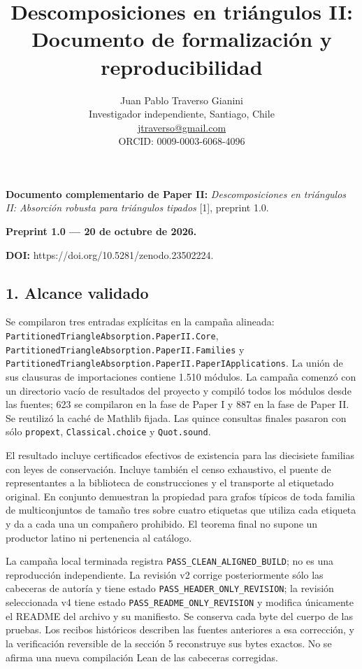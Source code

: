 \documentclass[spanish,11pt,a4paper]{article}
\title{Descomposiciones en triángulos II: Documento de formalización y reproducibilidad}
\author{Juan Pablo Traverso Gianini\\
\small Investigador independiente, Santiago, Chile\\
\small \href{mailto:jtraverso@gmail.com}{jtraverso@gmail.com}\\
\small ORCID: 0009-0003-6068-4096}
\date{}
\begin{document}
\raggedbottom
\maketitle
\textbf{Documento complementario de Paper II:} \emph{Descomposiciones en triángulos II: Absorción robusta para triángulos tipados} {[}1{]}, preprint 1.0.

\textbf{Preprint 1.0 --- 20 de octubre de 2026.}

\textbf{DOI:} https://doi.org/10.5281/zenodo.23502224.

\subsection{1. Alcance validado}\label{alcance-validado}

Se compilaron tres entradas explícitas en la campaña alineada: \texttt{Partitioned\allowbreak{}T\allowbreak{}riangle\allowbreak{}Absor\allowbreak{}ption.\allowbreak{}Paper\allowbreak{}I\allowbreak{}I.\allowbreak{}Core}, \texttt{Partitioned\allowbreak{}T\allowbreak{}riangle\allowbreak{}Absor\allowbreak{}ption.\allowbreak{}Paper\allowbreak{}I\allowbreak{}I.\allowbreak{}Families} y \texttt{Partitioned\allowbreak{}T\allowbreak{}riangle\allowbreak{}Absor\allowbreak{}ption.\allowbreak{}Paper\allowbreak{}I\allowbreak{}I.\allowbreak{}Paper\allowbreak{}IAppl\allowbreak{}ications}. La unión de sus clausuras de importaciones contiene 1.510 módulos. La campaña comenzó con un directorio vacío de resultados del proyecto y compiló todos los módulos desde las fuentes; 623 se compilaron en la fase de Paper I y 887 en la fase de Paper II. Se reutilizó la caché de Mathlib fijada. Las quince consultas finales pasaron con sólo \texttt{propext}, \texttt{Classical.\allowbreak{}ch\allowbreak{}oice} y \texttt{Quot.\allowbreak{}sound}.

El resultado incluye certificados efectivos de existencia para las diecisiete familias con leyes de conservación. Incluye también el censo exhaustivo, el puente de representantes a la biblioteca de construcciones y el transporte al etiquetado original. En conjunto demuestran la propiedad para grafos típicos de toda familia de multiconjuntos de tamaño tres sobre cuatro etiquetas que utiliza cada etiqueta y da a cada una un compañero prohibido. El teorema final no supone un productor latino ni pertenencia al catálogo.

La campaña local terminada registra \texttt{PASS\_\allowbreak{}CLEAN\_\allowbreak{}A\allowbreak{}LIGNED\_\allowbreak{}BUILD\allowbreak{}}; no es una reproducción independiente. La revisión v2 corrige posteriormente sólo las cabeceras de autoría y tiene estado \texttt{PASS\_\allowbreak{}HEADER\_\allowbreak{}\allowbreak{}ONLY\_\allowbreak{}REVISIO\allowbreak{}N}; la revisión seleccionada v4 tiene estado \texttt{PASS\_\allowbreak{}README\_\allowbreak{}\allowbreak{}ONLY\_\allowbreak{}REVISIO\allowbreak{}N} y modifica únicamente el README del archivo y su manifiesto. Se conserva cada byte del cuerpo de las pruebas. Los recibos históricos describen las fuentes anteriores a esa corrección, y la verificación reversible de la sección 5 reconstruye sus bytes exactos. No se afirma una nueva compilación Lean de las cabeceras corregidas.
\end{document}
